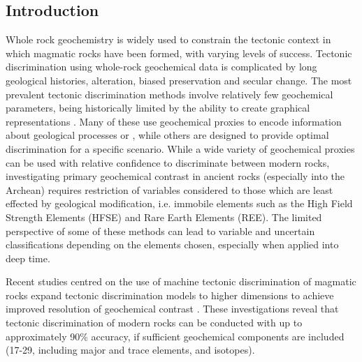 \documentclass[a4,10pt]{article}
\begin{document}
	\begin{multicols*}{2}[]
	
	\subsection*{Introduction}
	
	Whole rock geochemistry is widely used to constrain the tectonic context in which magmatic rocks have been formed, with varying levels of success. Tectonic discrimination using whole-rock geochemical data is complicated by long geological histories, alteration, biased preservation and secular change. The most prevalent tectonic discrimination methods involve relatively few geochemical parameters, being historically limited by the ability to create graphical representations \citep[i.e. bivariate or ternary discrimination diagrams;][]{Pearce1973}. Many of these use geochemical proxies to encode information about geological processes or \citep[e.g. the 'Pearce diagrams' which use Th/Yb, Nb/Yb and TiO2/Yb as proxies for subduction influence, source enrichment and depth of mantle melting respectively;][]{Pearce2008}, while others are designed to provide optimal discrimination for a specific scenario. While a wide variety of geochemical proxies can be used with relative confidence to discriminate between modern rocks, investigating primary geochemical contrast in ancient rocks (especially into the Archean) requires restriction of variables considered to those which are least effected by geological modification, i.e. immobile elements such as the High Field Strength Elements (HFSE) and Rare Earth Elements (REE). The limited perspective of some of these methods can lead to variable and uncertain classifications depending on the elements chosen, especially when applied into deep time. 
	
	Recent studies centred on the use of machine tectonic discrimination of magmatic rocks expand tectonic discrimination models to higher dimensions to achieve improved resolution of geochemical contrast \citep[using support vector machines, random forests and sparse multinomial regression;][]{Petrelli2016,Ueki2018}. These investigations reveal that tectonic discrimination of modern rocks can be conducted with up to approximately 90\% accuracy, if sufficient geochemical components are included (17-29, including major and trace elements, and isotopes).
	

\end{multicols*}
\end{document}
